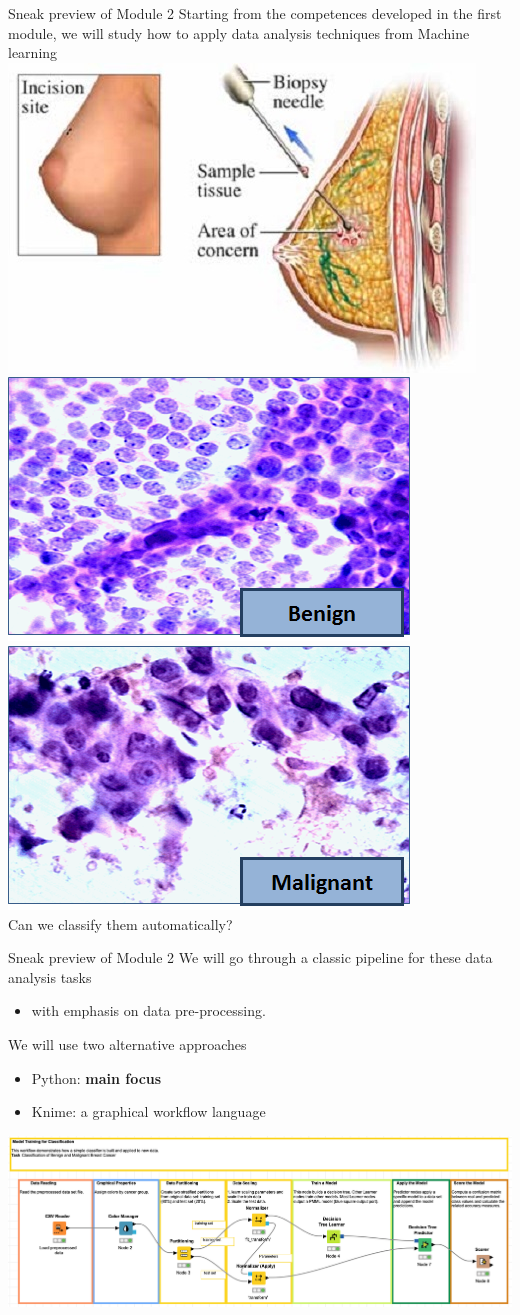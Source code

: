 \documentclass{beamer}%
\begin{document}
\begin{frame}{Sneak preview of Module 2}
	\centering 
	Starting from the competences developed in the first module, we will study
	how to apply data analysis techniques from Machine learning
	\includegraphics[width=0.4\linewidth]{figures/Breast-Biopsy-2.jpg}\\
	\includegraphics[width=0.4\linewidth]{figures/fna-benign1.png}
	\includegraphics[width=0.4\linewidth]{figures/fna-malignant1.png}\\
	Can we classify them automatically?
\end{frame}

\begin{frame}{Sneak preview of Module 2}
	We will go through a classic pipeline for these data analysis tasks
\begin{itemize}
	\item with emphasis on data pre-processing.
	\end{itemize}		
We will use two alternative approaches 
	\begin{itemize}
		\item Python: \textbf{main focus}
		\item Knime: a graphical workflow language
	\end{itemize}		
\centering
	\includegraphics[width=1.0\linewidth]{figures/knimepipeline.png}
\end{frame}
\end{document}
